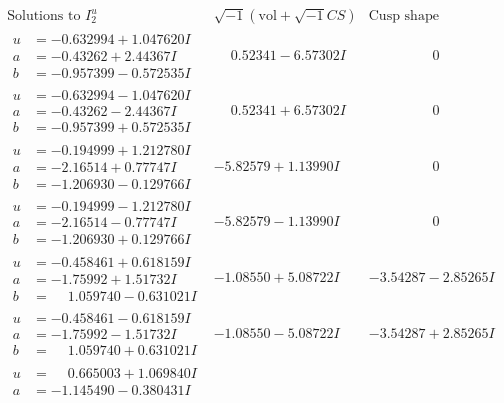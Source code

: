 \documentclass[1p]{elsarticle_modified}
\theoremstyle{definition}
\newcommand{\I}{\sqrt{-1}}
\begin{document}
$$\begin{array}{c|c|c}
\text{Solutions to }I^u_{2}& \I (\text{vol} + \sqrt{-1}CS) & \text{Cusp shape}\\
 \hline 
\begin{aligned}
u &= -0.632994 + 1.047620 I \\
a &= -0.43262 + 2.44367 I \\
b &= -0.957399 - 0.572535 I\end{aligned}
 & \phantom{-}0.52341 - 6.57302 I & \phantom{-0.000000 } 0 \\ \hline\begin{aligned}
u &= -0.632994 - 1.047620 I \\
a &= -0.43262 - 2.44367 I \\
b &= -0.957399 + 0.572535 I\end{aligned}
 & \phantom{-}0.52341 + 6.57302 I & \phantom{-0.000000 } 0 \\ \hline\begin{aligned}
u &= -0.194999 + 1.212780 I \\
a &= -2.16514 + 0.77747 I \\
b &= -1.206930 - 0.129766 I\end{aligned}
 & -5.82579 + 1.13990 I & \phantom{-0.000000 } 0 \\ \hline\begin{aligned}
u &= -0.194999 - 1.212780 I \\
a &= -2.16514 - 0.77747 I \\
b &= -1.206930 + 0.129766 I\end{aligned}
 & -5.82579 - 1.13990 I & \phantom{-0.000000 } 0 \\ \hline\begin{aligned}
u &= -0.458461 + 0.618159 I \\
a &= -1.75992 + 1.51732 I \\
b &= \phantom{-}1.059740 - 0.631021 I\end{aligned}
 & -1.08550 + 5.08722 I & -3.54287 - 2.85265 I \\ \hline\begin{aligned}
u &= -0.458461 - 0.618159 I \\
a &= -1.75992 - 1.51732 I \\
b &= \phantom{-}1.059740 + 0.631021 I\end{aligned}
 & -1.08550 - 5.08722 I & -3.54287 + 2.85265 I \\ \hline\begin{aligned}
u &= \phantom{-}0.665003 + 1.069840 I \\
a &= -1.145490 - 0.380431 I \\

\end{aligned}
\end{array}$$
\end{document}
